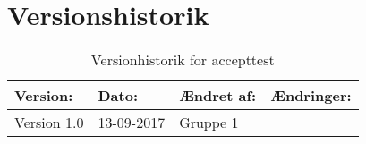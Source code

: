 \chapter{Versionshistorik}
\begin{table}[H]
\begin{center}
\begin{tabular} {| p{4cm} | p{2cm} | p{2cm} |p{5cm} |}
\hline
\textbf{Version:} & \textbf{Dato:} & \textbf{Ændret af:} & \textbf{Ændringer:} \\ \hline
Version 1.0 & 13-09-2017 & Gruppe 1 &  \\ \hline
\end{tabular}
\end{center}
\caption{Versionhistorik for accepttest}
\label{tb:ksversion}
\end{table}
